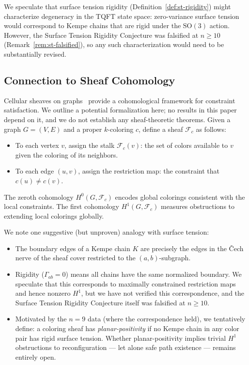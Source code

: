\begin{remark}\label{rem:tqft-rigidity}
We speculate that surface tension rigidity
(Definition~\ref{def:st-rigidity}) might characterize degeneracy in the
TQFT state space: zero-variance surface tension would correspond to
Kempe chains that are rigid under the $\mathrm{SO}(3)$ action. However,
the Surface Tension Rigidity Conjecture was falsified at $n \geq 10$
(Remark~\ref{rem:st-falsified}), so any such characterization would
need to be substantially revised.
\end{remark}

\subsection{Connection to Sheaf Cohomology}\label{sec:sheaf}

Cellular sheaves on graphs~\cite{ghrist2014} provide a cohomological
framework for constraint satisfaction. We outline a potential
formalization here; no results in this paper depend on it, and we do not
establish any sheaf-theoretic theorems. Given a graph $G = (V, E)$ and
a proper $k$-coloring $c$, define a sheaf $\mathcal{F}_c$ as follows:
\begin{itemize}
  \item To each vertex $v$, assign the stalk $\mathcal{F}_c(v)$: the
    set of colors available to $v$ given the coloring of its neighbors.
  \item To each edge $(u, v)$, assign the restriction map: the
    constraint that $c(u) \neq c(v)$.
\end{itemize}
The zeroth cohomology $H^0(G, \mathcal{F}_c)$ encodes global colorings
consistent with the local constraints. The first cohomology
$H^1(G, \mathcal{F}_c)$ measures obstructions to extending local
colorings globally.

We note one suggestive (but unproven) analogy with surface tension:
\begin{itemize}
  \item The boundary edges of a Kempe chain $K$ are precisely the
    edges in the \v{C}ech nerve of the sheaf cover restricted to the
    $(a,b)$-subgraph.
  \item Rigidity ($\Gamma_{ab} = 0$) means all chains have the same
    normalized boundary. We speculate that this corresponds to maximally
    constrained restriction maps and hence nonzero $H^1$, but we have
    not verified this correspondence, and the Surface Tension Rigidity
    Conjecture itself was falsified at $n \geq 10$.
  \item Motivated by the $n = 9$ data (where the correspondence held),
    we tentatively define: a coloring sheaf has \emph{planar-positivity}
    if no Kempe chain in any color pair has rigid surface tension.
    Whether planar-positivity implies trivial $H^1$ obstructions to
    reconfiguration — let alone safe path existence — remains entirely
    open.
\end{itemize}

